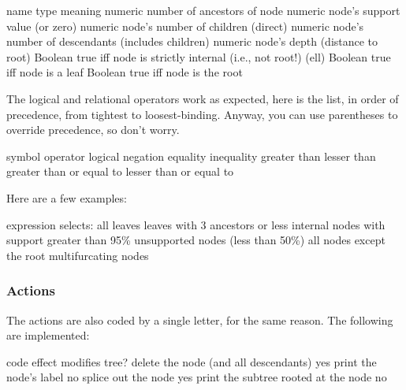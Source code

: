 \startalignment[center]
\starttabulate[|c|l|l|]
name \NC type \NC meaning \NC\NR
\HL
{} \NC numeric \NC number of ancestors of node	 \NC\NR
{} \NC numeric \NC node's support value (or zero) \NC\NR
{} \NC numeric \NC node's number of children (direct) \NC\NR
{} \NC numeric \NC node's number of descendants (includes children) \NC\NR
{} \NC numeric \NC node's depth (distance to root) \NC\NR
{} \NC Boolean \NC true iff node is strictly internal (i.e., not root!) \NC\NR
{} (ell) \NC Boolean \NC true iff node is a leaf \NC\NR
{} \NC Boolean \NC true iff node is the root
\stoptabulate
\stopalignment

The logical and relational operators work as expected, here is the list, in
order of precedence, from tightest to loosest-binding.  Anyway, you can use
parentheses to override precedence, so don't worry.

\startalignment[center]
\starttabulate[|c|l|]
\NC symbol 		\NC operator \NC\NR
\HL
\NC \code{!} 	\NC logical negation \NC\NR
\HL
\NC \code{==}	\NC equality \NC\NR
\NC \code{!=} \NC inequality \NC\NR
\NC \code{<} 	\NC greater than \NC\NR
\NC \code{>} 	\NC lesser than \NC\NR
\NC \code{>=} \NC greater than or equal to \NC\NR
\NC \code{<=} \NC lesser than or equal to \NC\NR
\stoptabulate
\stopalignment

Here are a few examples:

\startalignment[center]
\starttabulate[|c|l|]
\NC expression \NC selects: \NC\NR
\HL
\NC {} \NC all leaves \NC\NR
\NC {} \NC leaves with 3 ancestors or less \NC\NR
\NC {} \NC internal nodes with support greater than 95\% \NC\NR 
\NC {} \NC unsupported nodes (less than 50\%) \NC\NR
\NC {} \NC all nodes except the root \NC\NR
\NC {} \NC multifurcating nodes
\stoptabulate
\stopalignment

\subsubsection{Actions}

The actions are also coded by a single letter, for the same reason. The following are implemented:

\startalignment[center]
\starttabulate[|c|l|c|]
code \NC effect \NC modifies tree?\NC\NR
\HL
{} \NC delete the node (and all descendants) \NC yes \NC\NR
{} \NC print the node's label \NC no \NC\NR
{} \NC splice out the node \NC yes \NC\NR
{} \NC print the subtree rooted at the node \NC no \NC\NR
\stoptabulate
\stopalignment

